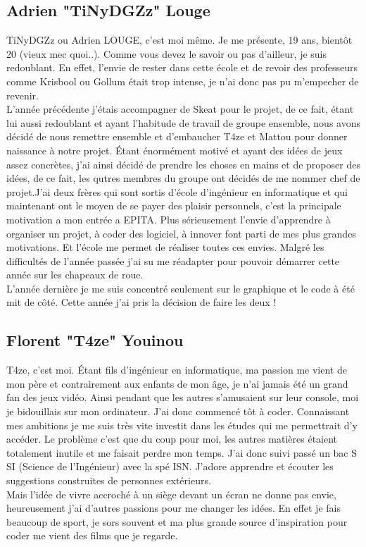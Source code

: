 \documentclass [11pt]{report}
\begin{document}
		\subsection {Adrien "TiNyDGZz" Louge}
			TiNyDGZz ou Adrien LOUGE, c'est moi même. Je me présente, 19 ans, bientôt 20 (vieux mec quoi..). Comme vous devez le savoir ou pas d'ailleur, je suis redoublant. En effet, l'envie de rester dans cette école et de revoir des professeurs comme Krisbool ou Gollum était trop intense, je n'ai donc pas pu m'empecher de revenir.\\
			 L'année précédente j'étais accompagner de Skeat pour le projet, de ce fait, étant lui aussi redoublant et ayant l'habitude de travail de groupe ensemble, nous avons décidé de nous remettre ensemble et d'embaucher T4ze et Mattou pour donner naissance à notre projet. Étant énormément motivé et ayant des idées de jeux assez concrètes, j'ai ainsi décidé de prendre les choses en mains et de proposer des idées, de ce fait, les qutres membres du groupe ont décidés de me nommer chef de projet.J'ai deux frères qui sont sortis d'école d'ingénieur en informatique et qui maintenant ont le moyen de se payer des plaisir personnels, c'est la principale motivation a mon entrée a EPITA. Plus sérieusement l'envie d'apprendre à organiser un projet, à coder des logiciel, à innover font parti de mes plus grandes motivations. Et l'école me permet de réaliser toutes ces envies. Malgré les difficultés de l'année passée j'ai su me réadapter pour pouvoir démarrer cette année sur les chapeaux de roue. \\
			 L'année dernière je me suis concentré seulement sur le graphique et le code à été mit de côté. Cette année j'ai pris la décision de faire les deux !\\\vspace{2mm}
	

		\subsection {Florent "T4ze" Youinou}
		T4ze, c’est moi. \'Etant fils d’ingénieur en informatique, ma passion me vient de mon père et contrairement aux enfants de mon âge, je n’ai jamais été un grand fan des jeux vidéo. Ainsi pendant que les autres s’amusaient sur leur console, moi je bidouillais sur mon ordinateur. J’ai donc commencé tôt à coder. Connaissant mes ambitions je me suis très vite investit dans les études qui me permettrait d’y accéder. Le problème c’est que du coup pour moi, les autres matières étaient totalement inutile et me faisait perdre mon temps. J’ai donc suivi passé un bac S SI (Science de l’Ingénieur) avec la spé ISN. J’adore apprendre et écouter les suggestions construites de personnes extérieurs.\\
\indent Mais l’idée de vivre accroché à un siège devant un écran ne donne pas envie, heureusement j’ai d’autres passions pour me changer les idées. En effet je fais beaucoup de sport, je sors souvent et ma plus grande source d’inspiration pour coder me vient des films que je regarde.\\\vspace{10mm}
\end{document}
